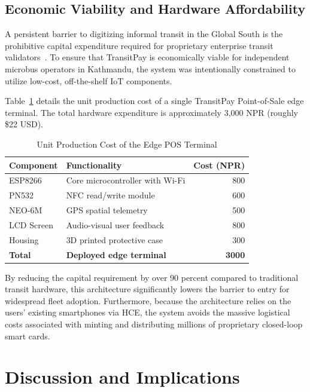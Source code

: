 \documentclass[manuscript,review,anonymous]{acmart}
\begin{document}
\subsection{Economic Viability and Hardware Affordability}
A persistent barrier to digitizing informal transit in the Global South is the prohibitive capital expenditure required for proprietary enterprise transit validators~\cite{worldbank2021fare}. To ensure that TransitPay is economically viable for independent microbus operators in Kathmandu, the system was intentionally constrained to utilize low-cost, off-the-shelf IoT components.

Table~\ref{tab:production_cost} details the unit production cost of a single TransitPay Point-of-Sale edge terminal. The total hardware expenditure is approximately 3,000 NPR (roughly \$22 USD).

\begin{table}[t]
  \centering
  \caption{Unit Production Cost of the Edge POS Terminal}
  \label{tab:production_cost}
  \begin{tabularx}{\columnwidth}{
    >{\RaggedRight\arraybackslash}p{5em}
    >{\RaggedRight\arraybackslash}X
    r
  }
  \toprule
  \textbf{Component} & \textbf{Functionality} & \textbf{Cost (NPR)} \\
  \midrule
  ESP8266 & Core microcontroller with Wi-Fi & 800 \\
  PN532 & NFC read/write module & 600 \\
  NEO-6M & GPS spatial telemetry & 500 \\
  LCD Screen & Audio-visual user feedback & 800 \\
  Housing & 3D printed protective case & 300 \\
  \midrule
  \textbf{Total} & \textbf{Deployed edge terminal} & \textbf{3000} \\
  \bottomrule
  \end{tabularx}
\end{table}



By reducing the capital requirement by over 90 percent compared to traditional transit hardware, this architecture significantly lowers the barrier to entry for widespread fleet adoption. Furthermore, because the architecture relies on the users' existing smartphones via HCE, the system avoids the massive logistical costs associated with minting and distributing millions of proprietary closed-loop smart cards.

\section{Discussion and Implications}
\end{document}
